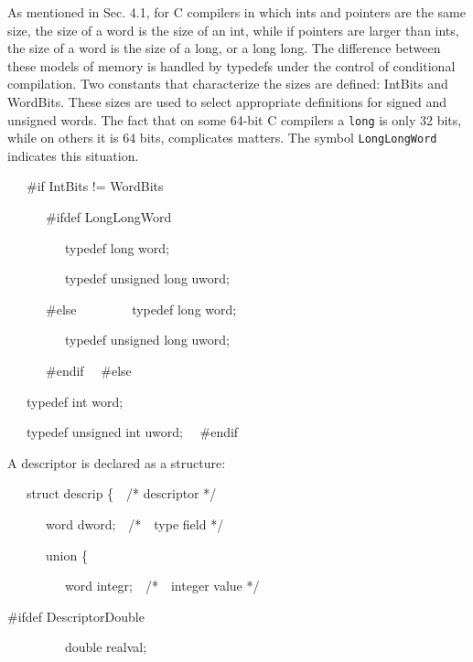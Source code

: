 As mentioned in Sec. 4.1, for C compilers in which ints and pointers
are the same size, the size of a word is the size of an int, while if
pointers are larger than ints, the size of a word is the size of a
long, or a long long. The difference between these models of memory is
handled by typedefs under the control of conditional compilation. Two
constants that characterize the sizes are defined: IntBits and
WordBits. These sizes are used to select appropriate definitions for
signed and unsigned words. The fact that on some 64-bit C compilers a
\texttt{long} is only 32 bits, while on others it is 64 bits,
complicates matters. The symbol \texttt{LongLongWord} indicates this
situation.

\bigskip

{\ttfamily\mdseries
\ \ \ \#if IntBits != WordBits}

{\ttfamily\color[rgb]{0.0,0.0,0.8}
\ \ \ \ \ \ \#ifdef LongLongWord}

{\ttfamily\color[rgb]{0.0,0.0,0.8}
\ \ \ \ \ \ \ \ \ typedef long word;}

{\ttfamily\color[rgb]{0.0,0.0,0.8}
\ \ \ \ \ \ \ \ \ typedef unsigned long uword;}

{\ttfamily\mdseries
\textcolor[rgb]{0.0,0.0,0.8}{\ \ \ \ \ \ \#else\newline
} \ \ \ \ \ \ \ \ typedef long word;}

{\ttfamily\mdseries
\ \ \ \ \ \ \ \ \ typedef unsigned long uword;}

{\ttfamily\mdseries
\textcolor[rgb]{0.0,0.0,0.8}{\ \ \ \ \ \ \#endif\newline
} \ \ \#else}

{\ttfamily\mdseries
\ \ \ typedef int word;}

{\ttfamily\mdseries
\ \ \ typedef unsigned int uword;\newline
 \ \ \#endif}


A descriptor is declared as a structure:

{\ttfamily\mdseries
\ \ \ struct descrip \{\ \ /* descriptor */}

{\ttfamily\mdseries
\ \ \ \ \ \ word dword;\ \ /*\ \ type field */}

{\ttfamily\mdseries
\ \ \ \ \ \ union \{}

{\ttfamily\mdseries
\ \ \ \ \ \ \ \ \ word integr;\ \ /*\ \ integer value */}

{\ttfamily\color[rgb]{0.0,0.0,0.8}
\#ifdef DescriptorDouble}

{\ttfamily\color[rgb]{0.0,0.0,0.8}
\ \ \ \ \ \ \ \ \ double realval;}

